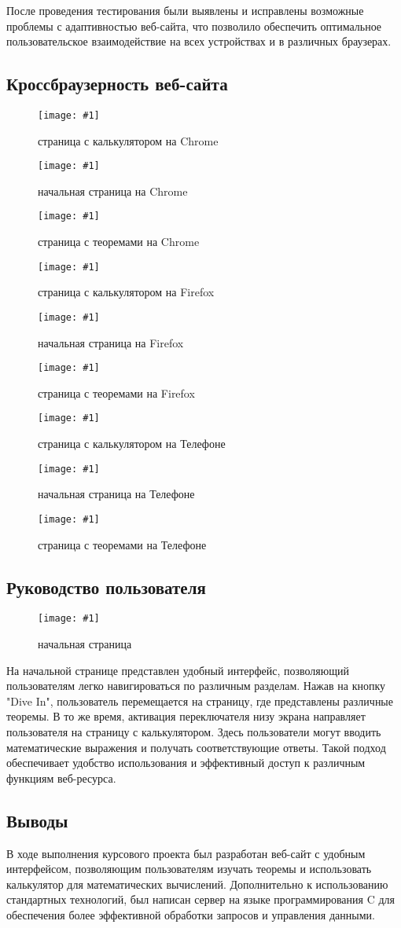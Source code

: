\documentclass{article}
\newcommand{\img}[2]{
    \begin{figure}[H]
        \centering
        \texttt{[image: \#1]}
        \caption{#2}
    \end{figure}
}
\begin{document}
    После проведения тестирования были выявлены и исправлены возможные проблемы с адаптивностью веб-сайта, что позволило обеспечить оптимальное пользовательское взаимодействие на всех устройствах и в различных браузерах.


    \subsection{Кроссбраузерность веб-сайта}

    
    \img{index_chrome.png}{страница с калькулятором на Chrome}
    \img{getstarted_chrome.png}{начальная страница на Chrome}
    \img{theorems_chrome.png}{страница с теоремами на Chrome}
    
    \img{index_firefox.png}{страница с калькулятором на Firefox}
    \img{getstarted_firefox.png}{начальная страница на Firefox}
    \img{theorems_firefox.png}{страница с теоремами на Firefox}
    
    \img{index_mobile.png}{страница с калькулятором на Телефоне}
    \img{getstarted_mobile.png}{начальная страница на Телефоне}
    \img{theorems_mobile.png}{страница с теоремами на Телефоне}
        
    


    \subsection{Руководство пользователя}

    \img{getstarted_firefox.png}{начальная страница}
    На начальной странице представлен удобный интерфейс, позволяющий пользователям легко навигироваться по различным разделам. Нажав на кнопку "Dive In", пользователь перемещается на страницу, где представлены различные теоремы. В то же время, активация переключателя низу экрана направляет пользователя на страницу с калькулятором. Здесь пользователи могут вводить математические выражения и получать соответствующие ответы. Такой подход обеспечивает удобство использования и эффективный доступ к различным функциям веб-ресурса.


    \subsection{Выводы}

    В ходе выполнения курсового проекта был разработан веб-сайт с удобным интерфейсом, позволяющим пользователям изучать теоремы и использовать калькулятор для математических вычислений. Дополнительно к использованию стандартных технологий, был написан сервер на языке программирования C для обеспечения более эффективной обработки запросов и управления данными.
\end{document}

